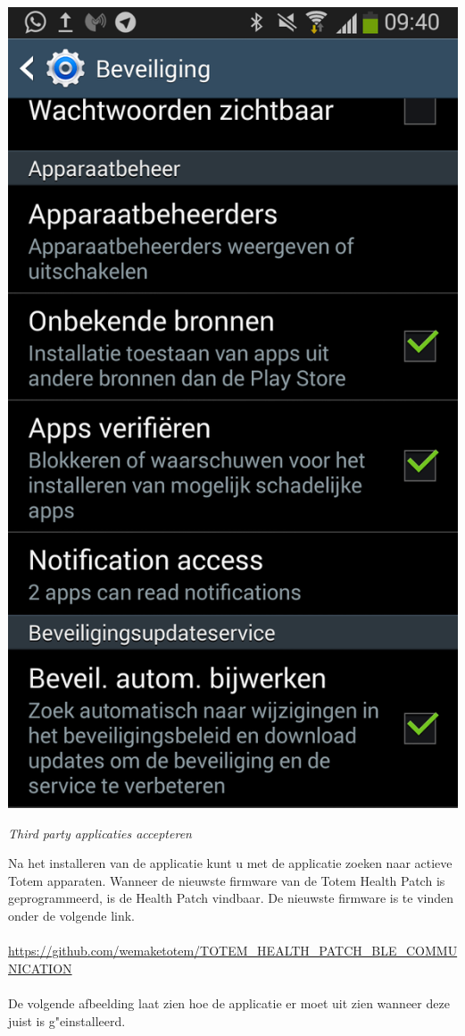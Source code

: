\documentclass[conference]{IEEEtran}
\begin{document}
\begin{center}
    \includegraphics[scale=0.3]{thirdparty}
    \begin{minipage}{0.6\textwidth}
    \footnotesize
    \emph{Third party applicaties accepteren}
    \end{minipage}
\end{center}

Na het installeren van de applicatie kunt u met de applicatie zoeken naar actieve Totem apparaten. Wanneer de nieuwste firmware van de Totem Health Patch is geprogrammeerd, is de Health Patch vindbaar. De nieuwste firmware is te vinden onder de volgende link. \\\\\url{https://github.com/wemaketotem/TOTEM_HEALTH_PATCH_BLE_COMMUNICATION}\\\\De volgende afbeelding laat zien hoe de applicatie er moet uit zien wanneer deze juist is g"einstalleerd.
\end{document}
